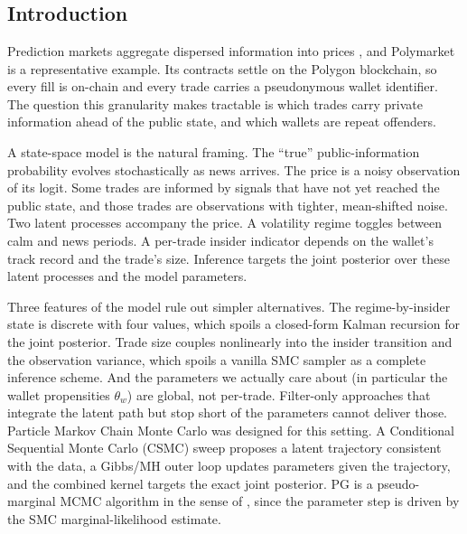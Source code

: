 
\section{\Large{}}\label{sec:pmcmc}

\subsection{Introduction}\label{ssec:intro}

Prediction markets aggregate dispersed information into prices \citep{wolfers2004prediction}, and Polymarket is a representative example. Its contracts settle on the Polygon blockchain, so every fill is on-chain and every trade carries a pseudonymous wallet identifier. The question this granularity makes tractable is which trades carry private information ahead of the public state, and which wallets are repeat offenders.

A state-space model is the natural framing. The ``true'' public-information probability evolves stochastically as news arrives. The price is a noisy observation of its logit. Some trades are informed by signals that have not yet reached the public state, and those trades are observations with tighter, mean-shifted noise. Two latent processes accompany the price. A volatility regime toggles between calm and news periods. A per-trade insider indicator depends on the wallet's track record and the trade's size. Inference targets the joint posterior over these latent processes and the model parameters.

Three features of the model rule out simpler alternatives. The regime-by-insider state is discrete with four values, which spoils a closed-form Kalman recursion for the joint posterior. Trade size couples nonlinearly into the insider transition and the observation variance, which spoils a vanilla SMC sampler as a complete inference scheme. And the parameters we actually care about (in particular the wallet propensities $\theta_w$) are global, not per-trade. Filter-only approaches that integrate the latent path but stop short of the parameters cannot deliver those. Particle Markov Chain Monte Carlo \citep{andrieu2010particle} was designed for this setting. A Conditional Sequential Monte Carlo (CSMC) sweep proposes a latent trajectory consistent with the data, a Gibbs/MH outer loop updates parameters given the trajectory, and the combined kernel targets the exact joint posterior. PG is a pseudo-marginal MCMC algorithm in the sense of \citet[Ch. 4.4]{sanzalonso2025notes}, since the parameter step is driven by the SMC marginal-likelihood estimate.

